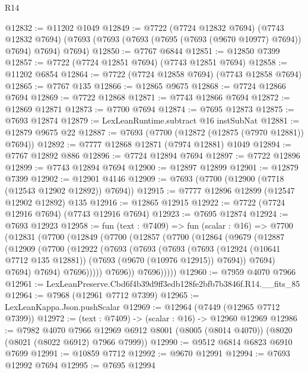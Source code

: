 \begin{lexlean}{R14}
\begin{coremodule}
@12832 := @11202 @1049
@12849 := @7722
    (@7724 @12832 @7694)
    (@7743 @12832 @7694)
    (@7693 (@7693 (@7693 (@7695 (@7693 (@9670 @10977) @7694)) @7694) @7694) @7694)
@12850 := @7767 @6844
@12851 := @12850 @7399
@12857 := @7722 (@7724 @12851 @7694) (@7743 @12851 @7694)
@12858 := @11202 @6854
@12864 := @7722 (@7724 @12858 @7694) (@7743 @12858 @7694)
@12865 := @7767 @135
@12866 := @12865 @9675
@12868 := @7724 @12866 @7694
@12869 := @7722 @12868
@12871 := @7743 @12866 @7694
@12872 := @12869 @12871
@12873 := @7700 @7694
@12874 := @7695 @12873
@12875 := @7693 @12874
@12879 := LexLeanRuntime.subtract @16 instSubNat
@12881 := @12879 @9675 @22
@12887 := @7693 (@7700 (@12872 (@12875 (@7970 @12881)) @7694))
@12892 := @7777 @12868 @12871 (@7974 @12881) @1049
@12894 := @7767 @12892 @886
@12896 := @7724 @12894 @7694
@12897 := @7722 @12896
@12899 := @7743 @12894 @7694
@12900 := @12897 @12899
@12901 := @12879 @7399
@12902 := @12901 @4146
@12909 := @7693 (@7700 (@12900 (@7718 (@12543 @12902 @12892)) @7694))
@12915 := @7777 @12896 @12899 (@12547 @12902 @12892) @135
@12916 := @12865 @12915
@12922 := @7722 (@7724 @12916 @7694) (@7743 @12916 @7694)
@12923 := @7695 @12874
@12924 := @7693 @12923
@12958 := fun (text : @7409) =>
  fun (scalar : @16) =>
  @7700
    (@12831
      (@7700
        (@12849
          (@7700
            (@12857
              (@7700
                (@12864
                  (@9679
                    (@12887
                      (@12909
                        (@7700
                          (@12922
                            (@7693
                              (@7693
                                (@7693
                                  (@7693
                                    (@12924 (@10641 @7712 @135 @12881))
                                    (@7693 (@9670 (@10976 @12915)) @7694))
                                  @7694)
                                @7694)
                              @7694)
                            @7696)))))
                  @7696))
              @7696)))))
@12960 := @7959 @4070 @7966
@12961 := LexLeanPreserve.Cbd6f4b39d9ff3edb128fe2bfb7b3846f.R14.__fits_85
@12964 := @7968 (@12961 @7712 @7399)
@12965 := LexLeanKappa.Json.pushScalar
@12969 := @12964 (@7449 (@12965 @7712 @7399))
@12972 := (text : @7409) -> (scalar : @16) -> @12960 @12969
@12986 := @7982
    @4070
    @7966
    @12969
    @6912
    @8001
    (@8005 (@8014 @4070))
    (@8020 (@8021 (@8022 @6912) @7966 @7999))
@12990 := @9512 @6814 @6823 @6910 @7699
@12991 := @10859 @7712
@12992 := @9670 @12991
@12994 := @7693 @12992 @7694
@12995 := @7695 @12994

\end{coremodule}
\end{lexlean}
